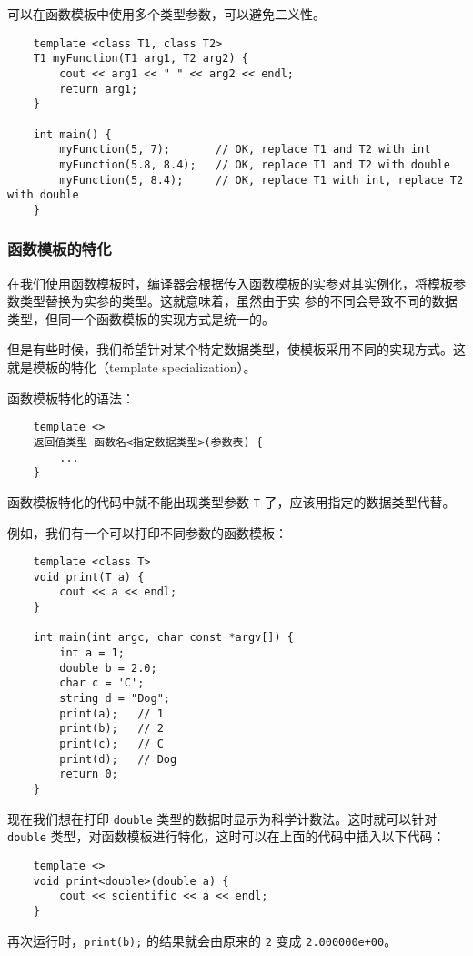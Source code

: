 \documentclass[UTF8]{ctexart}
\begin{document}
可以在函数模板中使用多个类型参数，可以避免二义性。
\begin{verbatim}
    template <class T1, class T2>
    T1 myFunction(T1 arg1, T2 arg2) {
        cout << arg1 << " " << arg2 << endl;
        return arg1;
    }

    int main() {
        myFunction(5, 7);       // OK, replace T1 and T2 with int
        myFunction(5.8, 8.4);   // OK, replace T1 and T2 with double
        myFunction(5, 8.4);     // OK, replace T1 with int, replace T2 with double
    }
\end{verbatim}

\subsubsection{函数模板的特化}
在我们使用函数模板时，编译器会根据传入函数模板的实参对其实例化，将模板参数类型替换为实参的类型。这就意味着，虽然由于实
参的不同会导致不同的数据类型，但同一个函数模板的实现方式是统一的。

但是有些时候，我们希望针对某个特定数据类型，使模板采用不同的实现方式。这就是模板的特化（template specialization）。

函数模板特化的语法：
\begin{verbatim}
    template <>
    返回值类型 函数名<指定数据类型>(参数表) {
        ...
    }
\end{verbatim}

函数模板特化的代码中就不能出现类型参数 \texttt{T} 了，应该用指定的数据类型代替。

例如，我们有一个可以打印不同参数的函数模板：
\begin{verbatim}
    template <class T>
    void print(T a) {
        cout << a << endl;
    }

    int main(int argc, char const *argv[]) {
        int a = 1;
        double b = 2.0;
        char c = 'C';
        string d = "Dog";
        print(a);   // 1
        print(b);   // 2
        print(c);   // C
        print(d);   // Dog
        return 0;
    }
\end{verbatim}

现在我们想在打印 \texttt{double} 类型的数据时显示为科学计数法。这时就可以针对\texttt{double}
类型，对函数模板进行特化，这时可以在上面的代码中插入以下代码：
\begin{verbatim}
    template <>
    void print<double>(double a) {
        cout << scientific << a << endl;
    }
\end{verbatim}

再次运行时，\texttt{print(b);} 的结果就会由原来的 \texttt{2} 变成 \texttt{2.000000e+00}。
\end{document}
